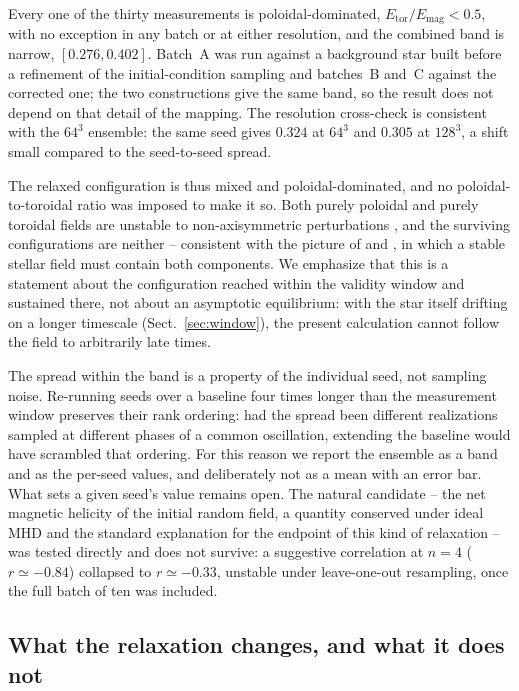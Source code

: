 \documentclass{aa}
\begin{document}
Every one of the thirty measurements is poloidal-dominated,
$E_{\mathrm{tor}}/E_{\mathrm{mag}} < 0.5$, with no exception in any
batch or at either resolution, and the combined band is narrow,
$[0.276, 0.402]$. Batch~A was run against a background star built
before a refinement of the initial-condition sampling and batches~B
and~C against the corrected one; the two constructions give the same
band, so the result does not depend on that detail of the mapping.
The resolution cross-check is consistent with the $64^3$ ensemble: the
same seed gives $0.324$ at $64^3$ and $0.305$ at $128^3$, a shift small
compared to the seed-to-seed spread.

The relaxed configuration is thus mixed and poloidal-dominated, and no
poloidal-to-toroidal ratio was imposed to make it so. Both purely
poloidal and purely toroidal fields are unstable to non-axisymmetric
perturbations \citep{tayler1973,markey1973}, and the surviving
configurations are neither -- consistent with the picture of
\citet{braithwaite2004} and \citet{braithwaite2006}, in which a stable
stellar field must contain both components. We emphasize that this is a
statement about the configuration reached within the validity window and
sustained there, not about an asymptotic equilibrium: with the star
itself drifting on a longer timescale (Sect.~\ref{sec:window}), the
present calculation cannot follow the field to arbitrarily late times.

The spread within the band is a property of the individual seed, not
sampling noise. Re-running seeds over a baseline four times longer than
the measurement window preserves their rank ordering: had the spread
been different realizations sampled at different phases of a common
oscillation, extending the baseline would have scrambled that ordering.
For this reason we report the ensemble as a band and as the per-seed
values, and deliberately not as a mean with an error bar. What sets a
given seed's value remains open. The natural candidate -- the net
magnetic helicity of the initial random field, a quantity conserved
under ideal MHD and the standard explanation for the endpoint of this
kind of relaxation -- was tested directly and does not survive: a
suggestive correlation at $n=4$ ($r \simeq -0.84$) collapsed to
$r \simeq -0.33$, unstable under leave-one-out resampling, once the
full batch of ten was included.

\subsection{What the relaxation changes, and what it does not}
\label{sec:evolution}
\end{document}

